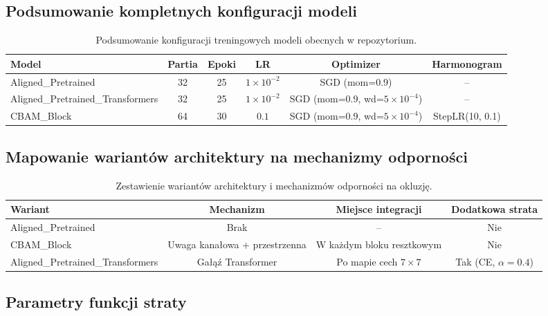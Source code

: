 \subsection{Podsumowanie kompletnych konfiguracji modeli}

\begin{table}[H]
\centering
\scriptsize
\begin{tabular}{l|ccccc}
\toprule
\textbf{Model} & \textbf{Partia} & \textbf{Epoki} & \textbf{LR} & \textbf{Optimizer} & \textbf{Harmonogram} \\
\midrule
Aligned\_Pretrained & 32 & 25 & $1\times10^{-2}$ & SGD (mom=0.9) & -- \\
Aligned\_Pretrained\_Transformers & 32 & 25 & $1\times10^{-2}$ & SGD (mom=0.9, wd=$5\times10^{-4}$) & -- \\
CBAM\_Block & 64 & 30 & $0.1$ & SGD (mom=0.9, wd=$5\times10^{-4}$) & StepLR(10, 0.1) \\
\bottomrule
\end{tabular}
\caption{Podsumowanie konfiguracji treningowych modeli obecnych w repozytorium.}
\label{tab:all_configs}
\end{table}

\subsection{Mapowanie wariantów architektury na mechanizmy odporności}

\begin{table}[H]
\centering
\scriptsize
\begin{tabular}{lccc}
\toprule
\textbf{Wariant} & \textbf{Mechanizm} & \textbf{Miejsce integracji} & \textbf{Dodatkowa strata} \\
\midrule
Aligned\_Pretrained & Brak & -- & Nie \\
CBAM\_Block & Uwaga kanałowa + przestrzenna & W każdym bloku resztkowym & Nie \\
Aligned\_Pretrained\_Transformers & Gałąź Transformer & Po mapie cech $7\times7$ & Tak (CE, $\alpha=0.4$) \\
\bottomrule
\end{tabular}
\caption{Zestawienie wariantów architektury i mechanizmów odporności na okluzję.}
\label{tab:arch_map}
\end{table}

\subsection{Parametry funkcji straty}

